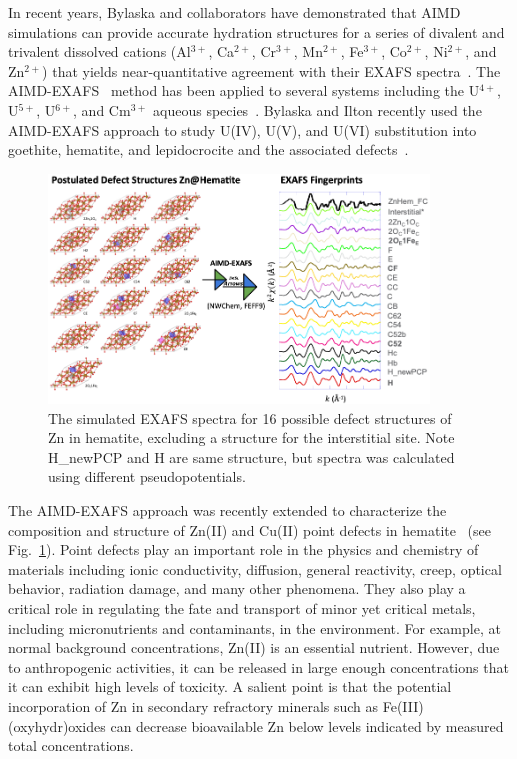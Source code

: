 \documentclass[runningheads,a4paper]{llncs}
\begin{document}
In recent years,  Bylaska and collaborators have demonstrated that AIMD simulations can provide accurate hydration structures for a series of divalent and trivalent dissolved cations (Al$^{3+}$, Ca$^{2+}$, Cr$^{3+}$, Mn$^{2+}$, Fe$^{3+}$, Co$^{2+}$, Ni$^{2+}$, and Zn$^{2+}$) that yields near-quantitative agreement with their EXAFS spectra~\cite{bylaska2007structure,fulton2012near,bogatko2010first,bogatko2013aqueous}.  The AIMD-EXAFS~\cite{fulton2012near,nichols2008equatorial} method has been applied to several systems including the U$^{4+}$, U$^{5+}$, U$^{6+}$, and Cm$^{3+}$ aqueous species~\cite{atta2012structure,solve2,atta2011hydration}. Bylaska and Ilton recently used the AIMD-EXAFS approach to study U(IV), U(V), and U(VI) substitution into goethite, hematite, and lepidocrocite and the associated defects~\cite{kerisit2016ab,mcbriarty2017trace,mcbriarty2018iron,ilton2020using}.


\begin{figure}[!H]
\includegraphics[angle=90,width=0.9\textwidth]{images/AIMD-EXAFS.png}
\caption{The simulated EXAFS spectra for 16 possible defect structures of Zn in hematite, excluding a structure for the interstitial site.  Note H\_newPCP and H are same structure, but spectra was calculated using different pseudopotentials.}
\label{fig.app.aimd-exafs}
\end{figure}


The AIMD-EXAFS approach was recently extended to characterize the composition and structure of  Zn(II) and Cu(II) point defects in hematite~\cite{bylaska2019association,mergelsberg2021resolving} (see Fig.~\ref{fig.app.aimd-exafs}). Point defects play an important role in the physics and chemistry of materials including ionic conductivity, diffusion, general reactivity, creep, optical behavior, radiation damage, and many other phenomena. They also play a critical role in regulating the fate and transport of minor yet critical metals, including micronutrients and contaminants, in the environment.  For example, at normal background concentrations, Zn(II) is an essential nutrient.  However, due to anthropogenic activities, it can be released in large enough concentrations that it can exhibit high levels of toxicity.  A salient point is that the potential incorporation of Zn in secondary refractory minerals such as Fe(III) (oxyhydr)oxides can decrease bioavailable Zn below levels indicated by measured total concentrations.  
\end{document}
